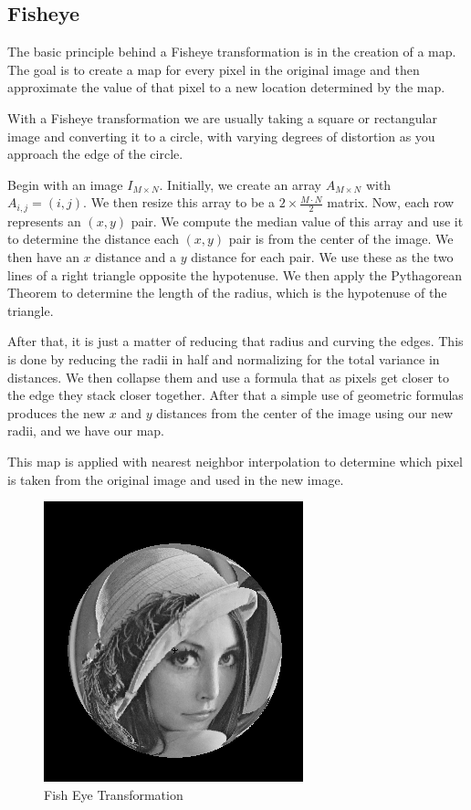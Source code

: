 \subsection{Fisheye} \label{subsec:fisheye}

The basic principle behind a Fisheye transformation is in the creation of a map. The goal is to create a map for every pixel in the original image and then approximate the value of that pixel to a new location determined by the map. 

With a Fisheye transformation we are usually taking a square or rectangular image and converting it to a circle, with varying degrees of distortion as you approach the edge of the circle. 

Begin with an image $I_{M\times N}$. Initially, we create an array $A_{M\times N}$ with $A_{i,j}=(i,j)$. We then resize this array to be a $2\times\frac{M\cdot N}{2}$ matrix. Now, each row represents an $(x,y)$ pair. We compute the median value of this array and use it to determine the distance each $(x,y)$ pair is from the center of the image. We then have an $x$ distance and a $y$ distance for each pair. We use these as the two lines of a right triangle opposite the hypotenuse. We then apply the Pythagorean Theorem to determine the length of the radius, which is the hypotenuse of the triangle. 

After that, it is just a matter of reducing that radius and curving the edges. This is done by reducing the radii in half and normalizing for the total variance in distances. We then collapse them and use a formula that as pixels get closer to the edge they stack closer together. After that a simple use of geometric formulas produces the new $x$ and $y$ distances from the center of the image using our new radii, and we have our map. 

This map is applied with nearest neighbor interpolation to determine which pixel is taken from the original image and used in the new image.

\begin{figure}[H]
    \centering
    \includegraphics[scale=0.5]{images/fisheye.png}
    \caption{Fish Eye Transformation}
    \label{fig:lenna-fish-eye}
\end{figure}